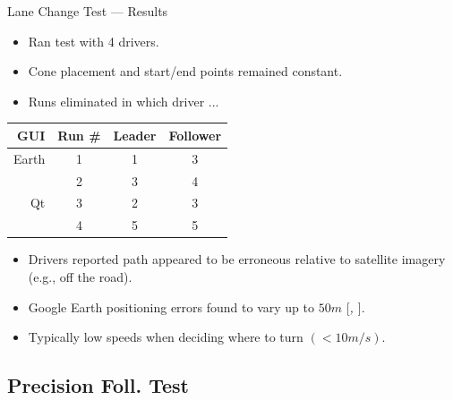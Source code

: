 \documentclass{beamer}
\newcommand{\citeitem}[1]{[\emph{\Citeauthor*{#1}, \citeyear{#1} }]}
\begin{document}
    \begin{frame}{Lane Change Test --- Results}
      \begin{itemize} \footnotesize
        \item Ran test with 4 drivers.
        \item Cone placement and start/end points remained constant.
        \item Runs eliminated in which driver ... 
      \end{itemize}
      \vspace{-10pt}
      \begin{table}[htbp] \centering \footnotesize
        \begin{tabular}{rc|cc}
          GUI&    Run \#  &     Leader&    Follower \\\hline\hline
          Earth&      1       &       1   &    3 \\
               &      2       &       3   &    4 \\ \hline
          Qt   &      3       &       2   &    3 \\
               &      4       &       5   &    5 \\ \hline   
        \end{tabular}
        \label{tab:lanechangeresults}
      \end{table}
      \begin{itemize} \footnotesize
        \item Drivers reported path appeared to be erroneous relative to satellite imagery (e.g., off the road).
        \item Google Earth positioning errors found to vary up to $50m$ \citeitem{ge_accuracy}.
        \item Typically low speeds when deciding where to turn $(<10m/s)$.
      \end{itemize}
    \end{frame}



  \subsection{Precision Foll. Test}
\end{document}
